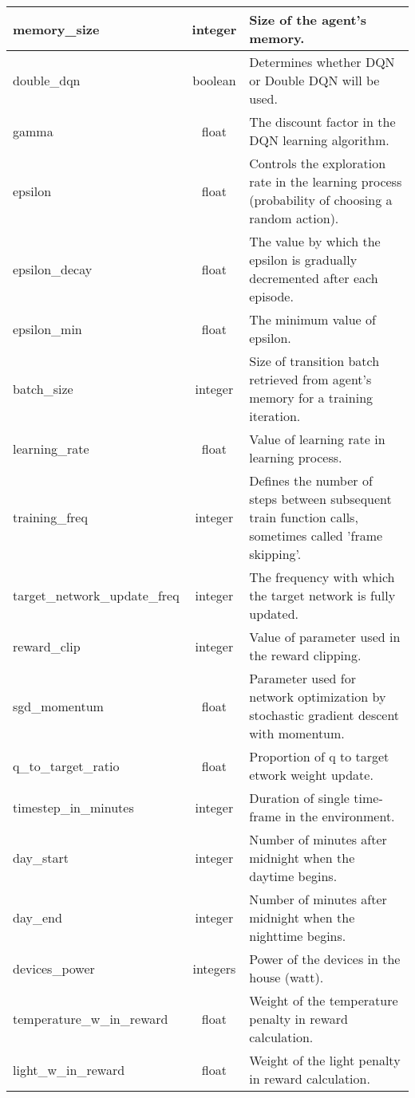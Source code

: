 \documentclass{article}
\begin{document}
{\begin{longtable}{l|c|p{9cm}}
    \hline
    memory\_size & integer & Size of the agent's memory.\\
    \hline
    double\_dqn & boolean & Determines whether DQN or Double DQN will  be used.\\
    \hline
    gamma & float & The discount factor in the DQN learning algorithm.\\
    \hline
    epsilon & float & Controls the exploration rate in the learning process (probability of choosing a random action).\\
    \hline
    epsilon\_decay & float & The value by which the epsilon is gradually decremented after each episode.\\
    \hline
    epsilon\_min & float & The minimum value of epsilon.\\
    \hline
    batch\_size & integer & Size of transition batch retrieved from agent's memory for a training iteration.\\
    \hline
    learning\_rate & float & Value of learning rate in learning process.\\
    \hline
    training\_freq & integer & Defines the number of steps between subsequent train function calls, sometimes called 'frame skipping'.\\
    \hline
    target\_network\_update\_freq & integer & The frequency with which the target network is fully updated.\\
    \hline
    reward\_clip & integer & Value of parameter used in the reward clipping.\\
    \hline
    sgd\_momentum & float & Parameter used for network optimization by stochastic gradient descent with momentum.\\
    \hline
    q\_to\_target\_ratio & float & Proportion of q to target etwork weight update. \\
    \hline
    timestep\_in\_minutes & integer & Duration of single time-frame in the environment.\\
    \hline
    day\_start & integer & Number of minutes after midnight when the daytime begins.\\
    \hline
    day\_end & integer & Number of minutes after midnight when the nighttime begins.\\
    \hline
    devices\_power & integers & Power of the devices in the house (watt).\\
    \hline
    temperature\_w\_in\_reward & float & Weight of the temperature penalty in reward calculation.\\
    \hline
    light\_w\_in\_reward & float & Weight of the light penalty in reward calculation.\\

\end{longtable}}
\end{document}

